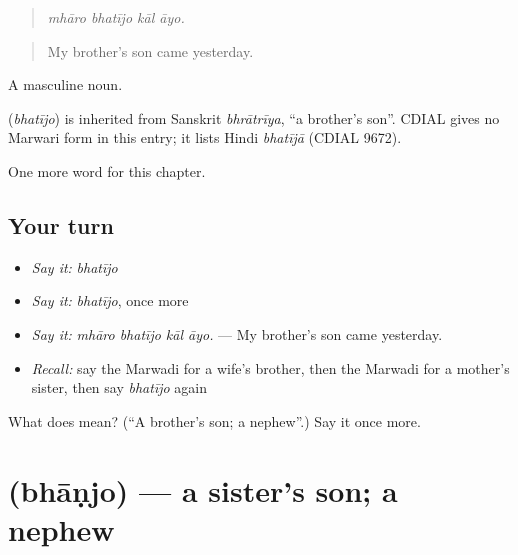 \begin{quote}
   
\end{quote}

\begin{quote}
\emph{mhāro bhatījo kāl āyo.}
\end{quote}

\begin{quote}
My brother's son came yesterday.
\end{quote}

A masculine noun.

\begin{cousinweb}
\textbf{} (\emph{bhatījo}) is inherited from Sanskrit \emph{bhrātrīya}, \textquotedblleft{}a brother's son\textquotedblright{}. CDIAL gives no Marwari form in this entry; it lists Hindi \emph{bhatījā} (CDIAL 9672).
\end{cousinweb}

\begin{grammarlens}[title={What you've built}]
One more word for this chapter.
\end{grammarlens}

\subsection*{Your turn}
\begin{itemize}
\raggedright
  \item \emph{Say it:} \emph{bhatījo}
  \item \emph{Say it:} \emph{bhatījo}, once more
  \item \emph{Say it:} \emph{mhāro bhatījo kāl āyo.} — My brother's son came yesterday.
  \item \emph{Recall:} say the Marwadi for a wife's brother, then the Marwadi for a mother's sister, then say \emph{bhatījo} again
\end{itemize}

\begin{tcolorbox}[breakable,colback=teal!4,colframe=teal!35!black,title={Before you move on}]
What does  mean? (\textquotedblleft{}A brother's son; a nephew\textquotedblright{}.) Say it once more.
\end{tcolorbox}
\section[\texorpdfstring{\mw{भाणजो} (bhāṇjo)}{भाणजो (bhāṇjo)}]{ (bhāṇjo) — a sister's son; a nephew}

